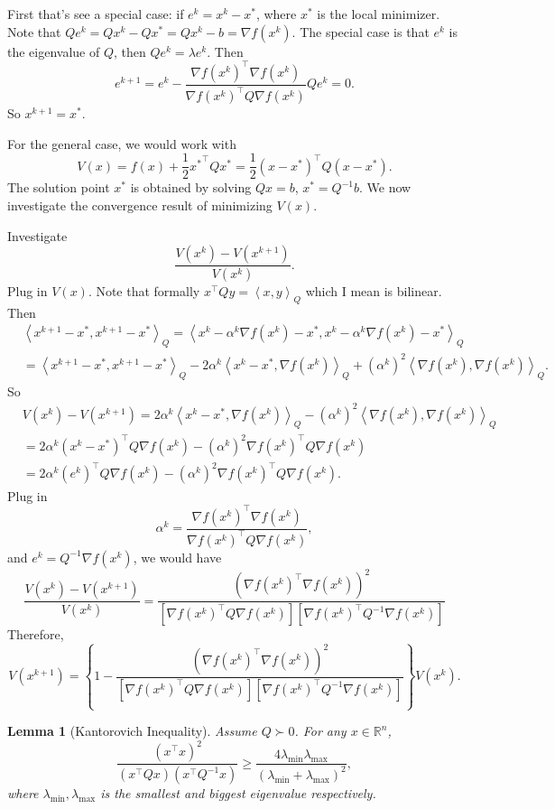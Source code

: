 \documentclass[12pt,a4paper]{report}
\numberwithin{equation}{section}
\theoremstyle{mystyle}
\newtheorem{lemma}[definition]{Lemma}
\newcommand{\R}{\mathbb{R}}
\newcommand{\grad}{\nabla}
\newcommand{\T}{\top}
\newcommand{\inner}[1]{\left\langle #1 \right\rangle}
\begin{document}
	First that's see a special case: if $e^k=x^k-x^*$, where $x^*$ is the local minimizer. Note that $Qe^k=Qx^k-Qx^*=Qx^k-b=\grad f(x^k)$.
	The special case is that $e^k$ is the eigenvalue of $Q$, then $Qe^k=\lambda e^k$. Then 
	$$
	e^{k+1}=e^k-\frac{\grad f(x^k)^\T \grad f(x^k)}{\grad f(x^k)^\T Q \grad f(x^k)} Q e^k=0.
	$$
	So $x^{k+1}=x^{*}$.
	
	For the general case, we would work with
	\begin{equation}
		V(x)=f(x)+\frac{1}{2}{x^*}^\T Qx^*=\frac{1}{2}(x-x^*)^\T Q (x-x^*).
	\end{equation}
	The solution point $x^*$ is obtained by solving $Qx=b$, $x^*=Q^{-1}b$. We now investigate the convergence result of minimizing $V(x)$.
	
	Investigate
	$$
	\frac{V(x^k)-V(x^{k+1})}{V(x^k)}.
	$$
	Plug in $V(x)$. Note that formally $x^\T Q y=\inner{x,y}_Q$ which I mean is bilinear. Then
	\begin{align*}
		&\inner{x^{k+1}-x^*, x^{k+1}-x^*}_Q=\inner{x^{k}-\alpha^k\grad f(x^k)-x^*,x^{k}-\alpha^k\grad f(x^k)-x^*}_Q\\
		&=\inner{x^{k+1}-x^*, x^{k+1}-x^*}_Q -2\alpha^k\inner{x^k-x^*, \grad f(x^k)}_Q + (\alpha^k)^2\inner{\grad f(x^k),\grad f(x^k)}_Q.
	\end{align*}
	So
	\begin{align*}
		&V(x^k)-V(x^{k+1})=2\alpha^k\inner{x^k-x^*, \grad f(x^k)}_Q - (\alpha^k)^2\inner{\grad f(x^k),\grad f(x^k)}_Q\\
		&=2\alpha^k(x^k-x^*)^\T Q \grad f(x^k)-(\alpha^k)^2\grad f(x^k)^\T Q \grad f(x^k)\\
		&=2\alpha^k(e^k)^\T Q \grad f(x^k)-(\alpha^k)^2\grad f(x^k)^\T Q \grad f(x^k).
	\end{align*}
	Plug in 
	$$
	\alpha^k=\frac{\grad f(x^k)^\T \grad f(x^k)}{\grad f(x^k)^\T Q \grad f(x^k)},
	$$
	and $e^k=Q^{-1}\grad f(x^k)$, we would have
	$$
	\frac{V(x^k)-V(x^{k+1})}{V(x^k)}=\frac{(\grad f(x^k)^\T \grad f(x^k))^2}{[\grad f(x^k)^\T Q \grad f(x^k)][\grad f(x^k)^\T Q^{-1} \grad f(x^k)]}
	$$
	Therefore,
	$$
	V(x^{k+1})=\left\{1-\frac{(\grad f(x^k)^\T \grad f(x^k))^2}{[\grad f(x^k)^\T Q \grad f(x^k)][\grad f(x^k)^\T Q^{-1} \grad f(x^k)]}  \right\}V(x^k).
	$$

	\begin{lemma}[Kantorovich Inequality]
		Assume $Q\succ 0$. For any $x\in \R^n$,
		$$
		\frac{(x^\T x)^2}{(x^\T Q x)(x^\T Q^{-1}x)}\geq \frac{4\lambda_{\min}\lambda_{\max}}{(\lambda_{\min}+\lambda_{\max})^2},
		$$
		where $\lambda_{\min},\lambda_{\max}$ is the smallest and biggest eigenvalue respectively.
	\end{lemma}
\end{document}
